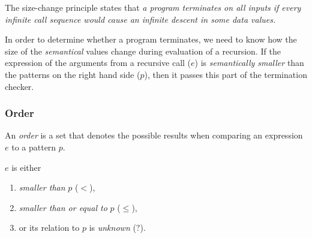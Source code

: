 The size-change principle states that \emph{a program terminates on all inputs if every infinite call sequence would cause an infinite descent in some data values.}

In order to determine whether a program terminates, we need to know how the size of the \emph{semantical} values change during evaluation of a recursion. If the expression of the arguments from a recursive call ($e$) is \emph{semantically smaller} than the patterns on the right hand side ($p$), then it passes this part of the termination checker.

\subsubsection{Order}

An \emph{order} is a set that denotes the possible results when comparing an expression $e$ to a pattern $p$.

$e$ is either

\begin{enumerate}
  \item \emph{smaller than} $p$ ($\boldsymbol{<}$),
  \item \emph{smaller than or equal to} $p$ ($\boldsymbol{\leq}$),
  \item or its relation to $p$ is \emph{unknown} ($\boldsymbol{?}$).
\end{enumerate}
